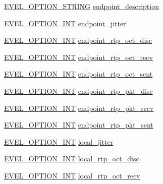 \begin{DoxyCompactItemize}
\item 
\hyperlink{evel_8h_a0de5113a7b72de93c0c7b644f7ea7ec3}{E\+V\+E\+L\+\_\+\+O\+P\+T\+I\+O\+N\+\_\+\+S\+T\+R\+I\+NG} \hyperlink{structevent__service_a0f06998cc84c4e53695b2f921de6116e}{endpoint\+\_\+description}
\item 
\hyperlink{evel_8h_a452d825778d1c2368a54b8f689a25ba7}{E\+V\+E\+L\+\_\+\+O\+P\+T\+I\+O\+N\+\_\+\+I\+NT} \hyperlink{structevent__service_af16ae1215238a692f0acfb5e1e955c18}{endpoint\+\_\+jitter}
\item 
\hyperlink{evel_8h_a452d825778d1c2368a54b8f689a25ba7}{E\+V\+E\+L\+\_\+\+O\+P\+T\+I\+O\+N\+\_\+\+I\+NT} \hyperlink{structevent__service_a017a571b2418cd0ac44ce9c269702aca}{endpoint\+\_\+rtp\+\_\+oct\+\_\+disc}
\item 
\hyperlink{evel_8h_a452d825778d1c2368a54b8f689a25ba7}{E\+V\+E\+L\+\_\+\+O\+P\+T\+I\+O\+N\+\_\+\+I\+NT} \hyperlink{structevent__service_a2b500295e5e5f7acbe22a47825fe1d41}{endpoint\+\_\+rtp\+\_\+oct\+\_\+recv}
\item 
\hyperlink{evel_8h_a452d825778d1c2368a54b8f689a25ba7}{E\+V\+E\+L\+\_\+\+O\+P\+T\+I\+O\+N\+\_\+\+I\+NT} \hyperlink{structevent__service_aba2edbc6092d913e34f3efff0b96687a}{endpoint\+\_\+rtp\+\_\+oct\+\_\+sent}
\item 
\hyperlink{evel_8h_a452d825778d1c2368a54b8f689a25ba7}{E\+V\+E\+L\+\_\+\+O\+P\+T\+I\+O\+N\+\_\+\+I\+NT} \hyperlink{structevent__service_a01cd2b29f1f8510f43a1d756de3b311a}{endpoint\+\_\+rtp\+\_\+pkt\+\_\+disc}
\item 
\hyperlink{evel_8h_a452d825778d1c2368a54b8f689a25ba7}{E\+V\+E\+L\+\_\+\+O\+P\+T\+I\+O\+N\+\_\+\+I\+NT} \hyperlink{structevent__service_a160d6d987c16c2196e8b90c673a3909b}{endpoint\+\_\+rtp\+\_\+pkt\+\_\+recv}
\item 
\hyperlink{evel_8h_a452d825778d1c2368a54b8f689a25ba7}{E\+V\+E\+L\+\_\+\+O\+P\+T\+I\+O\+N\+\_\+\+I\+NT} \hyperlink{structevent__service_addec20dbe742e8268bb6693ad180fd60}{endpoint\+\_\+rtp\+\_\+pkt\+\_\+sent}
\item 
\hyperlink{evel_8h_a452d825778d1c2368a54b8f689a25ba7}{E\+V\+E\+L\+\_\+\+O\+P\+T\+I\+O\+N\+\_\+\+I\+NT} \hyperlink{structevent__service_aa7a1acf4370f01b30c66772db7ac7d89}{local\+\_\+jitter}
\item 
\hyperlink{evel_8h_a452d825778d1c2368a54b8f689a25ba7}{E\+V\+E\+L\+\_\+\+O\+P\+T\+I\+O\+N\+\_\+\+I\+NT} \hyperlink{structevent__service_aad4071bdb0de9e17f13ea6745f5093e4}{local\+\_\+rtp\+\_\+oct\+\_\+disc}
\item 
\hyperlink{evel_8h_a452d825778d1c2368a54b8f689a25ba7}{E\+V\+E\+L\+\_\+\+O\+P\+T\+I\+O\+N\+\_\+\+I\+NT} \hyperlink{structevent__service_a55bec3b5cbf893aa866cccd5011bfbf7}{local\+\_\+rtp\+\_\+oct\+\_\+recv}

\end{DoxyCompactItemize}
